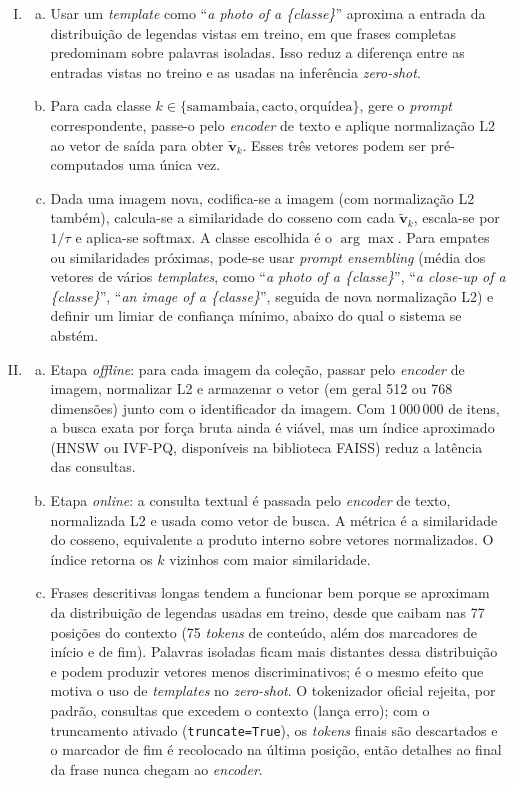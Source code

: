 \documentclass{dlproblemset}
\begin{document}
\begin{enumerate}[I)]
    \item
    \begin{enumerate}[(a)]
        \item Usar um \textit{template} como ``\textit{a photo of a \{classe\}}'' aproxima a entrada da distribuição de legendas vistas em treino, em que frases completas predominam sobre palavras isoladas. Isso reduz a diferença entre as entradas vistas no treino e as usadas na inferência \textit{zero-shot}.
        \item Para cada classe $k \in \{\text{samambaia}, \text{cacto}, \text{orquídea}\}$, gere o \textit{prompt} correspondente, passe-o pelo \textit{encoder} de texto e aplique normalização L2 ao vetor de saída para obter $\tilde{\mathbf{v}}_k$. Esses três vetores podem ser pré-computados uma única vez.
        \item Dada uma imagem nova, codifica-se a imagem (com normalização L2 também), calcula-se a similaridade do cosseno com cada $\tilde{\mathbf{v}}_k$, escala-se por $1/\tau$ e aplica-se $\mathrm{softmax}$. A classe escolhida é o $\arg\max$. Para empates ou similaridades próximas, pode-se usar \textit{prompt ensembling} (média dos vetores de vários \textit{templates}, como ``\textit{a photo of a \{classe\}}'', ``\textit{a close-up of a \{classe\}}'', ``\textit{an image of a \{classe\}}'', seguida de nova normalização L2) e definir um limiar de confiança mínimo, abaixo do qual o sistema se abstém.
    \end{enumerate}

    \item
    \begin{enumerate}[(a)]
        \item Etapa \textit{offline}: para cada imagem da coleção, passar pelo \textit{encoder} de imagem, normalizar L2 e armazenar o vetor (em geral 512 ou 768 dimensões) junto com o identificador da imagem. Com $1\,000\,000$ de itens, a busca exata por força bruta ainda é viável, mas um índice aproximado (HNSW ou IVF-PQ, disponíveis na biblioteca FAISS) reduz a latência das consultas.
        \item Etapa \textit{online}: a consulta textual é passada pelo \textit{encoder} de texto, normalizada L2 e usada como vetor de busca. A métrica é a similaridade do cosseno, equivalente a produto interno sobre vetores normalizados. O índice retorna os $k$ vizinhos com maior similaridade.
        \item Frases descritivas longas tendem a funcionar bem porque se aproximam da distribuição de legendas usadas em treino, desde que caibam nas 77 posições do contexto (75 \textit{tokens} de conteúdo, além dos marcadores de início e de fim). Palavras isoladas ficam mais distantes dessa distribuição e podem produzir vetores menos discriminativos; é o mesmo efeito que motiva o uso de \textit{templates} no \textit{zero-shot}. O tokenizador oficial rejeita, por padrão, consultas que excedem o contexto (lança erro); com o truncamento ativado (\texttt{truncate=True}), os \textit{tokens} finais são descartados e o marcador de fim é recolocado na última posição, então detalhes ao final da frase nunca chegam ao \textit{encoder}.
    \end{enumerate}


\end{enumerate}
\end{document}
